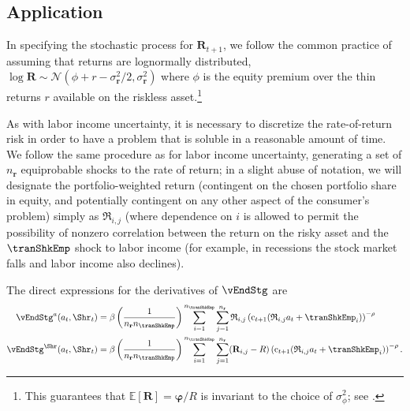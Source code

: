 \documentclass[titlepage, headings=optiontotocandhead]{econtex}
\begin{document}
\subsection{Application}\label{subsec:MCApplication}


In specifying the stochastic process for ${\mathbf{R}}_{t+1}$, we follow the common practice of assuming that returns are lognormally distributed, $\log {\mathbf{R}} \sim \mathcal{N}(\phi+r-\sigma^{2}_{{\mathbf{r}}}/2,\sigma^{2}_{{\mathbf{r}}})$ where $\phi$ is the equity premium over the thin returns $r$ available on the riskless asset.\footnote{This guarantees that ${\mathbb{E}}[{\mathbf{R}}] = \pmb{\varphi}/R$ is invariant to the choice of $\sigma^{2}_{\phi}$; see .}

As with labor income uncertainty, it is necessary to discretize the rate-of-return risk in order to have a problem that is soluble in a reasonable amount of time.  We follow the same procedure as for labor income uncertainty, generating a set of $n_{{\mathbf{r}}}$ equiprobable shocks to the rate of return; in a slight abuse of notation, we will designate the portfolio-weighted return (contingent on the chosen portfolio share in equity, and potentially contingent on any other aspect of the consumer's problem) simply as $\mathfrak{R}_{i,j}$ (where dependence on $i$ is allowed to permit the possibility of nonzero correlation between the return on the risky asset and the $\tranShkEmp$ shock to labor income (for example, in recessions the stock market falls and labor income also declines).

The direct expressions for the derivatives of $\vEndStg$ are
\begin{equation}\begin{gathered}\begin{aligned}
      \vEndStg^{a}(a_{t},\Shr_{t})  & = \beta \left(\frac{1}{n_{{\mathbf{r}}} n_{\tranShkEmp}}\right)\sum_{i=1}^{n_{\tranShkEmp}}\sum_{j=1}^{n_{{\mathbf{r}}} }\mathfrak{R}_{i,j} \left(\mathrm{c}_{t+1}(\mathfrak{R}_{i,j}a_{t}+\tranShkEmp_{i})\right)^{-\rho}
      \\      \vEndStg^{\Shr}(a_{t},\Shr_{t})  & = \beta \left(\frac{1}{n_{{\mathbf{r}}} n_{\tranShkEmp}}\right)\sum_{i=1}^{n_{\tranShkEmp}}\sum_{j=1}^{n_{{\mathbf{r}}} }({\mathbf{R}}_{i,j}-R)\left(\mathrm{c}_{t+1}(\mathfrak{R}_{i,j}a_{t}+\tranShkEmp_{i})\right)^{-\rho}.
    \end{aligned}\end{gathered}\end{equation}
\end{document}
